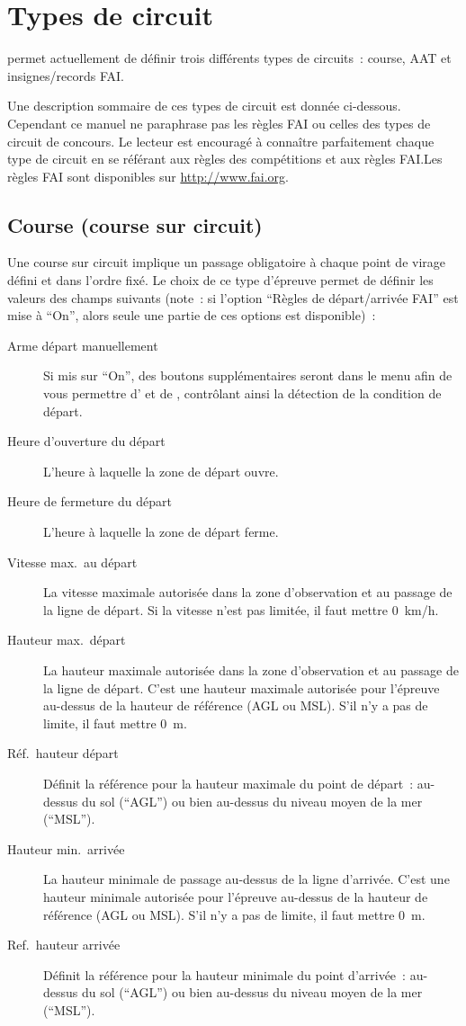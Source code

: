 \section{Types de circuit}
\xc{} permet actuellement de définir trois différents types de circuits~: course, AAT et insignes/records FAI.\@

Une description sommaire de ces types de circuit est donnée ci-dessous. Cependant ce manuel
ne paraphrase pas les règles FAI ou celles des types de circuit de concours. Le
lecteur est encouragé à connaître parfaitement chaque type de circuit en se référant aux règles des compétitions
et aux règles FAI.\@ Les règles FAI sont disponibles sur \url{http://www.fai.org}. 

\subsection*{Course (course sur circuit)}
Une course sur circuit implique un passage obligatoire à chaque point de virage défini et dans l'ordre fixé. 
Le choix de ce type d'épreuve permet de définir les valeurs des champs suivants
(note~: si l'option ``Règles de départ/arrivée FAI'' est mise à ``On'', alors seule une partie de ces options est disponible)~:
  \begin{description}
  \item [Arme départ manuellement] Si mis sur ``On'', des boutons supplémentaires seront dans le menu  afin de vous permettre d' et de , contrôlant ainsi la détection de la condition de départ.
  \item [Heure d'ouverture du départ] L'heure à laquelle la zone de départ ouvre.
  \item [Heure de fermeture du départ] L'heure à laquelle la zone de départ ferme.
  \item [Vitesse max.\ au départ] La vitesse maximale autorisée dans la zone d'observation et au passage de la ligne de départ.
  Si la vitesse n'est pas limitée, il faut mettre 0~km/h.
  \item [Hauteur max.\ départ] La hauteur maximale autorisée dans la zone d'observation et au passage de la ligne de départ.
  C'est une hauteur maximale autorisée pour l'épreuve au-dessus de la hauteur de référence (AGL ou MSL). S'il n'y a pas de limite, il faut mettre 0~m.
  \item [Réf.\ hauteur départ] Définit la référence pour la hauteur maximale du point de départ~: au-dessus du sol (``AGL'') ou bien au-dessus du niveau moyen de la mer (``MSL'').
  \item [Hauteur min.\ arrivée] La hauteur minimale de passage au-dessus de la ligne d'arrivée. 
  C'est une hauteur minimale autorisée pour l'épreuve au-dessus de la hauteur de référence (AGL ou MSL). S'il n'y a pas de limite, il faut mettre 0~m.
  \item [Ref.\ hauteur arrivée] Définit la référence pour la hauteur minimale du point d'arrivée~: au-dessus du sol (``AGL'') ou bien au-dessus du niveau moyen de la mer (``MSL'').
  \end{description}

